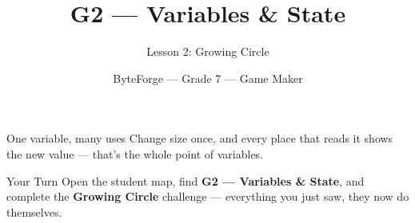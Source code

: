 \documentclass[aspectratio=169]{beamer}
\title{G2 — Variables \& State}
\subtitle{Lesson 2: Growing Circle}
\author{ByteForge --- Grade 7 --- Game Maker}
\date{}
\begin{document}
\begin{frame}
    \titlepage
\end{frame}

\begin{frame}{One variable, many uses}
    \Large
    Change size once, and every place that reads it shows the new value — that's the whole point of variables.
\end{frame}

\begin{frame}{Your Turn}
    \Large
    Open the student map, find \textbf{G2 — Variables \& State}, and complete
    the \textbf{Growing Circle} challenge --- everything you just saw, they now do themselves.
\end{frame}
\end{document}
